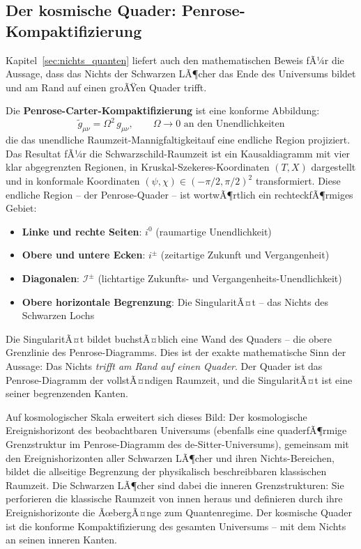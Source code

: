 ﻿\documentclass[12pt,a4paper]{report}
\begin{document}
\subsection{Der kosmische Quader: Penrose-Kompaktifizierung}

Kapitel~\ref{sec:nichts_quanten} liefert auch den mathematischen Beweis fÃ¼r die Aussage, dass das Nichts der Schwarzen LÃ¶cher das Ende des Universums bildet und am Rand auf einen groÃŸen Quader trifft.

Die \textbf{Penrose-Carter-Kompaktifizierung} \cite{penrose2004,misner1973} ist eine konforme Abbildung:
\begin{equation*}
    \tilde{g}_{\mu\nu} = \Omega^2\, g_{\mu\nu}, \qquad \Omega \to 0 \text{ an den Unendlichkeiten}
\end{equation*}
die das unendliche Raumzeit-Mannigfaltigkeitauf eine endliche Region projiziert. Das Resultat fÃ¼r die Schwarzschild-Raumzeit ist ein Kausaldiagramm mit vier klar abgegrenzten Regionen, in Kruskal-Szekeres-Koordinaten $(T, X)$ dargestellt und in konformale Koordinaten $(\psi, \chi) \in (-\pi/2, \pi/2)^2$ transformiert. Diese endliche Region -- der Penrose-Quader -- ist wortwÃ¶rtlich ein rechteckfÃ¶rmiges Gebiet:

\begin{itemize}
    \item \textbf{Linke und rechte Seiten}: $i^0$ (raumartige Unendlichkeit)
    \item \textbf{Obere und untere Ecken}: $i^\pm$ (zeitartige Zukunft und Vergangenheit)
    \item \textbf{Diagonalen}: $\mathscr{I}^\pm$ (lichtartige Zukunfts- und Vergangenheits-Unendlichkeit)
    \item \textbf{Obere horizontale Begrenzung}: Die SingularitÃ¤t -- das Nichts des Schwarzen Lochs
\end{itemize}

Die SingularitÃ¤t bildet buchstÃ¤blich eine Wand des Quaders -- die obere Grenzlinie des Penrose-Diagramms. Dies ist der exakte mathematische Sinn der Aussage: Das Nichts \emph{trifft am Rand auf einen Quader}. Der Quader ist das Penrose-Diagramm der vollstÃ¤ndigen Raumzeit, und die SingularitÃ¤t ist eine seiner begrenzenden Kanten.

Auf kosmologischer Skala erweitert sich dieses Bild: Der kosmologische Ereignishorizont des beobachtbaren Universums (ebenfalls eine quaderfÃ¶rmige Grenzstruktur im Penrose-Diagramm des de-Sitter-Universums), gemeinsam mit den Ereignishorizonten aller Schwarzen LÃ¶cher und ihren Nichts-Bereichen, bildet die allseitige Begrenzung der physikalisch beschreibbaren klassischen Raumzeit. Die Schwarzen LÃ¶cher sind dabei die inneren Grenzstrukturen: Sie perforieren die klassische Raumzeit von innen heraus und definieren durch ihre Ereignishorizonte die ÃœbergÃ¤nge zum Quantenregime. Der kosmische Quader ist die konforme Kompaktifizierung des gesamten Universums -- mit dem Nichts an seinen inneren Kanten.
\end{document}
